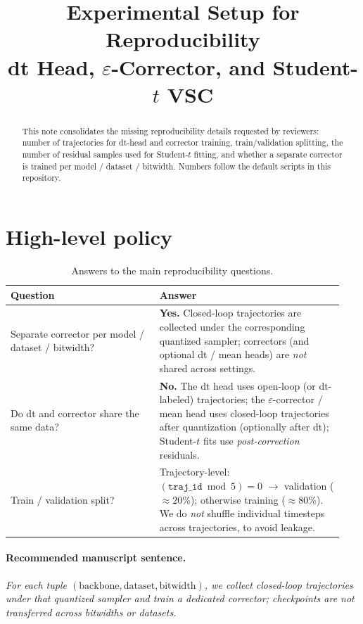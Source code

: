 \documentclass[11pt]{article}
\title{Experimental Setup for Reproducibility\\
\large dt Head, $\varepsilon$-Corrector, and Student-$t$ VSC}
\author{}
\date{}
\newcommand{\trajid}{\texttt{traj\_id}}
\begin{document}
\maketitle

\begin{abstract}
This note consolidates the missing reproducibility details requested by reviewers:
number of trajectories for dt-head and corrector training, train/validation splitting,
the number of residual samples used for Student-$t$ fitting, and whether a separate
corrector is trained per model / dataset / bitwidth.
Numbers follow the default scripts in this repository.
\end{abstract}

\section{High-level policy}

\begin{table}[t]
\centering
\caption{Answers to the main reproducibility questions.}
\label{tab:policy}
\begin{tabular}{@{}p{0.42\linewidth}p{0.52\linewidth}@{}}
\toprule
\textbf{Question} & \textbf{Answer} \\
\midrule
Separate corrector per model / dataset / bitwidth?
& \textbf{Yes.} Closed-loop trajectories are collected under the corresponding quantized sampler; correctors (and optional dt / mean heads) are \emph{not} shared across settings. \\
\addlinespace
Do dt and corrector share the same data?
& \textbf{No.} The dt head uses open-loop (or dt-labeled) trajectories; the $\varepsilon$-corrector / mean head uses closed-loop trajectories after quantization (optionally after dt); Student-$t$ fits use \emph{post-correction} residuals. \\
\addlinespace
Train / validation split?
& Trajectory-level: $(\trajid \bmod 5)=0$ $\rightarrow$ validation ($\approx 20\%$); otherwise training ($\approx 80\%$). We do \emph{not} shuffle individual timesteps across trajectories, to avoid leakage. \\
\bottomrule
\end{tabular}
\end{table}

\paragraph{Recommended manuscript sentence.}
\emph{For each tuple $(\mathrm{backbone},\mathrm{dataset},\mathrm{bitwidth})$, we collect closed-loop trajectories under that quantized sampler and train a dedicated corrector; checkpoints are not transferred across bitwidths or datasets.}
\end{document}

